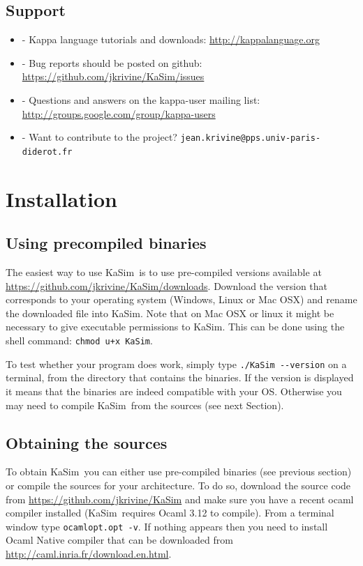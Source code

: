\documentclass[11pt]{book}
\def\KaSim{\textsf{KaSim}}
\def\ttt#1{\texttt{#1}}
\def\ITE#1{\begin{itemize}#1\end{itemize}}
\def\dd{-\hspace{0.001cm}-}
\begin{document}
\section{Support}
\ITE{
\item[-] Kappa language tutorials and downloads: \url{http://kappalanguage.org}
\item[-] Bug reports should be posted on github: \url{https://github.com/jkrivine/KaSim/issues}
\item[-] Questions and answers on the kappa-user mailing list: \url{http://groups.google.com/group/kappa-users}
\item[-] Want to contribute to the project? \ttt{jean.krivine@pps.univ-paris-diderot.fr}
}

\chapter{Installation}\label{chap:install}

\section{Using precompiled binaries}
The easiest way to use \KaSim~is to use pre-compiled versions available at \url{https://github.com/jkrivine/KaSim/downloads}. Download the version that corresponds to your operating system (Windows, Linux or Mac OSX) and rename the downloaded file into \KaSim. Note that on Mac OSX or linux it might be necessary to give executable permissions to \KaSim. This can be done using the shell command:  
\ttt{chmod u+x KaSim}. 

To test whether your program does work, simply type \ttt{./KaSim \dd version} on a terminal, from the directory that contains the binaries. If the version is displayed it means that the binaries are indeed compatible with your OS. Otherwise you may need to compile \KaSim~from the sources (see next Section).

\section{Obtaining the sources}
To obtain \KaSim~you can either use pre-compiled binaries (see previous section) or compile the sources for your architecture. To do so, download the source code from \url{https://github.com/jkrivine/KaSim} and make sure you have a recent ocaml compiler installed (\KaSim~requires Ocaml 3.12 to compile). From a terminal window type \ttt{ocamlopt.opt -v}. If nothing appears then you need to install Ocaml Native compiler that can be downloaded from \url{http://caml.inria.fr/download.en.html}. 
\end{document}
